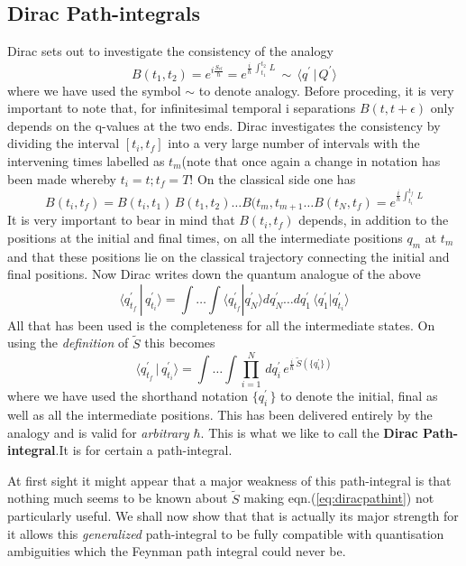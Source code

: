 \documentclass[12pt]{article}
\newcommand{\be}{\begin{equation}}
\newcommand{\ee}{\end{equation}}
\begin{document}
\subsection{Dirac Path-integrals}
Dirac sets out to investigate the consistency of the analogy
\be
\label{eq:consistency}
B(t_1,t_2) = e^{i \frac{S_{cl}}{\hbar}} = e^{\frac{i}{\hbar}\,\int_{t_1}^{t_2}\,L}\,\sim\,\langle q^\prime\,|\,Q^\prime\rangle
\ee
where we have used the symbol $\sim$ to denote analogy. Before proceding, it is very important to note that, for infinitesimal temporal i
separations $B(t,t+\epsilon)$ only depends on the q-values at the two ends. Dirac investigates the consistency by dividing the interval
$[t_i , t_f]$ into a very large number of intervals with the intervening times labelled as $t_m$(note that once again a change in notation
has been made whereby $t_i = t;t_f = T$! On the classical side one has
\be
\label{eq:consistency1}
B(t_i , t_f) = B(t_i,t_1)\,B(t_1,t_2) \ldots B(t_m, t_{m+1} \ldots B(t_N,t_f) = e^{\frac{i}{\hbar}\int_{t_i}^{t_f}\,L}
\ee
It is very important to bear in mind that $B(t_i,t_f)$ depends, in addition to the positions at the initial and final times, on all the 
intermediate positions $q_m$ at $t_m$ and that these positions lie on the classical trajectory connecting the initial and final positions.
Now Dirac writes down the quantum analogue of the above
\be
\label{eq:qconsistency}
\langle q_{t_f}^\prime\,|\,q_{t_i}^\prime \rangle  = \int\ldots \int \langle q_{t_f}^\prime|q_N^\prime\rangle dq_N^\prime\ldots
dq_1^\prime\,\langle q_1^\prime|q_{t_i}^\prime\rangle
\ee
All that has been used is the completeness for all the intermediate states. On using the {\it definition} of ${\tilde S}$ this becomes
\be
\label{eq:diracpathint}
\langle q_{t_f}^\prime\,|\,q_{t_i}^\prime \rangle  =  \int \ldots \int \prod_{i=1}^{N}\,dq_i^\prime\,e^{\frac{i}{\hbar}\,{\tilde S}(\{q_i^\prime\})}
\ee 
where we have used the shorthand notation $\{q_i^\prime\,\}$ to denote the initial, final as well as all the intermediate positions. This
has been delivered entirely by the analogy and is valid for {\it arbitrary} $\hbar$. This is what we like to call the {\bf Dirac Path-integral}.It is for certain a path-integral.

At first sight it might appear that a major weakness of this path-integral is that nothing much seems to be known about ${\tilde S}$ making
 eqn.(\ref{eq:diracpathint}) not particularly useful. We shall now show that that is actually its major strength for it allows this
{\it generalized} path-integral to be fully compatible with quantisation ambiguities which the Feynman path integral could never be.
\end{document}
